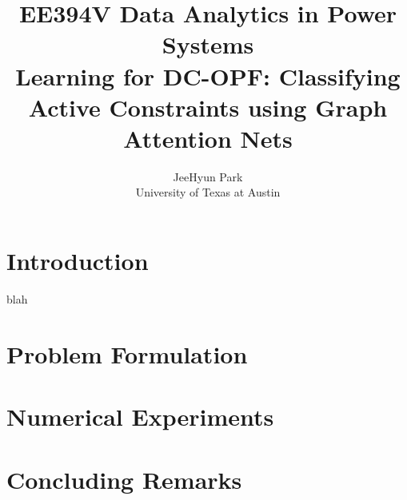 \documentclass [11pt]{article}
\title{\textbf{EE394V Data Analytics in Power Systems\\\medskip Learning for DC-OPF: Classifying Active Constraints using Graph Attention Nets}}
\author{JeeHyun Park\\University of Texas at Austin}
\begin{document}
\maketitle
\nocite{*}


\section{Introduction}
blah \cite{Velickovic2018GraphAN}

\section{Problem Formulation}


\section{Numerical Experiments}


\section{Concluding Remarks}



\end{document}
